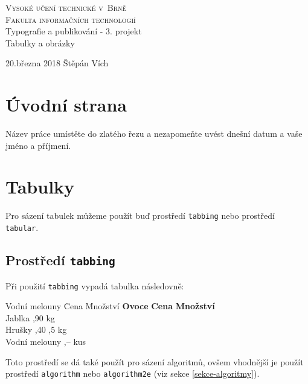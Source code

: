 \documentclass[11pt,titlepage,a4paper]{article}
\begin{document}
\begin{titlepage}

\begin{center}

\textsc{\Huge{Vysoké učení technické v~Brně} \\[3mm] \huge{Fakulta informačních technologií}}\\
\huge{Typografie a publikování - 3. projekt}\\[0mm]
\Huge{Tabulky a obrázky}


\Large{20.března 2018 \hfill
Štěpán Vích}
\end{center}
\end{titlepage}


\section{Úvodní strana}
Název práce umístěte do zlatého řezu a nezapomeňte uvést dnešní datum a vaše jméno a příjmení.

\section{Tabulky}
Pro sázení tabulek můžeme použít buď prostředí \texttt{tabbing} nebo prostředí \texttt{tabular}.

\subsection{Prostředí \texttt{tabbing}}
Při použití \texttt{tabbing} vypadá tabulka následovně:




\begin{tabbing}

Vodní melouny \quad \= Cena \quad \= Množství \kill
\textbf{Ovoce}  \> \textbf{Cena} \> \textbf{Množství} \\
Jablka  ,90  kg \\
Hrušky ,40 ,5 kg \\
Vodní melouny ,--  kus \\

\end{tabbing}




\noindent Toto prostředí se dá také použít pro sázení algoritmů, ovšem vhodnější je použít 
prostředí \texttt{algorithm} nebo \texttt{algorithm2e} (viz sekce \ref{sekce-algoritmy}).
\end{document}
